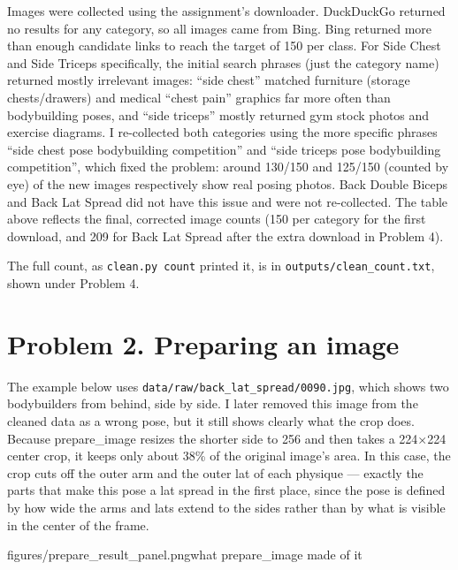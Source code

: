 \documentclass[11pt]{article}
\begin{document}
Images were collected using the assignment's downloader. DuckDuckGo returned no results for any category, so all images came from Bing. Bing returned more than enough candidate links to reach the target of 150 per class. For Side Chest and Side Triceps specifically, the initial search phrases (just the category name) returned mostly irrelevant images: ``side chest'' matched furniture (storage chests/drawers) and medical ``chest pain'' graphics far more often than bodybuilding poses, and ``side triceps'' mostly returned gym stock photos and exercise diagrams. I re-collected both categories using the more specific phrases ``side chest pose bodybuilding competition'' and ``side triceps pose bodybuilding competition'', which fixed the problem: around 130/150 and 125/150 (counted by eye) of the new images respectively show real posing photos. Back Double Biceps and Back Lat Spread did not have this issue and were not re-collected. The table above reflects the final, corrected image counts (150 per category for the first download, and 209 for Back Lat Spread after the extra download in Problem 4).

The full count, as \texttt{clean.py count} printed it, is in \texttt{outputs/clean\_count.txt}, shown under Problem 4.

\section*{Problem 2. Preparing an image}

The example below uses \texttt{data/raw/back\_lat\_spread/0090.jpg}, which shows two bodybuilders from behind, side by side. I later removed this image from the cleaned data as a wrong pose, but it still shows clearly what the crop does. Because prepare\_image resizes the shorter side to 256 and then takes a 224$\times$224 center crop, it keeps only about 38\% of the original image's area. In this case, the crop cuts off the outer arm and the outer lat of each physique --- exactly the parts that make this pose a lat spread in the first place, since the pose is defined by how wide the arms and lats extend to the sides rather than by what is visible in the center of the frame.

           {figures/prepare_result_panel.png}{what prepare\_image made of it}


\end{document}
